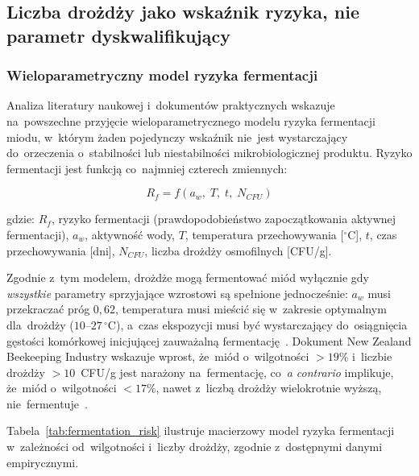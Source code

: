 \subsection{Liczba drożdży jako wskaźnik ryzyka, nie parametr dyskwalifikujący}

\subsubsection{Wieloparametryczny model ryzyka fermentacji}

Analiza literatury naukowej i~dokumentów praktycznych wskazuje
na~powszechne przyjęcie wieloparametrycznego modelu ryzyka
fermentacji miodu, w~którym żaden pojedynczy wskaźnik nie~jest
wystarczający do~orzeczenia o~stabilności lub niestabilności
mikrobiologicznej produktu. Ryzyko fermentacji jest funkcją
co~najmniej czterech zmiennych:

\begin{equation}
R_f = f\!\left(a_w,\; T,\; t,\; N_{CFU}\right)
\label{eq:fermentation_risk}
\end{equation}

\noindent gdzie: $R_f$, ryzyko fermentacji (prawdopodobieństwo
zapoczątkowania aktywnej fermentacji), $a_w$, aktywność wody,
$T$, temperatura przechowywania [$^\circ$C], $t$, czas
przechowywania [dni], $N_{CFU}$, liczba drożdży osmofilnych
[CFU/g].

Zgodnie z~tym modelem, drożdże mogą fermentować miód wyłącznie
gdy \emph{wszystkie} parametry sprzyjające wzrostowi są spełnione
jednocześnie: $a_w$ musi przekraczać próg $0{,}62$, temperatura
musi mieścić się w~zakresie optymalnym dla~drożdży ($10$--$27\,^\circ$C),
a~czas ekspozycji musi być wystarczający do~osiągnięcia gęstości
komórkowej inicjującej zauważalną fermentację~\cite{apinz2021}.
Dokument New Zealand Beekeeping Industry wskazuje wprost, że~miód
o~wilgotności $> 19\%$ i~liczbie drożdży $> 10$~CFU/g
jest narażony na~fermentację, co~\emph{a contrario} implikuje,
że~miód o~wilgotności $< 17\%$, nawet z~liczbą drożdży
wielokrotnie wyższą, nie~fermentuje~\cite{apinz2021}.

Tabela~\ref{tab:fermentation_risk} ilustruje macierzowy model
ryzyka fermentacji w~zależności od~wilgotności i~liczby drożdży,
zgodnie z~dostępnymi danymi empirycznymi.


